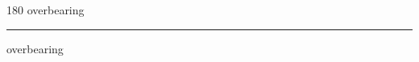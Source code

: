 
\begin{frame}
\begin{center}
\begin{turn}{180}
{\fontsize{2.5cm}{1em}\selectfont overbearing}
\end{turn}
\vspace{1em}\par  
\hrule
\vspace{1em}\par  
{\fontsize{2.5cm}{1em}\selectfont overbearing}
\end{center}
\end{frame}
